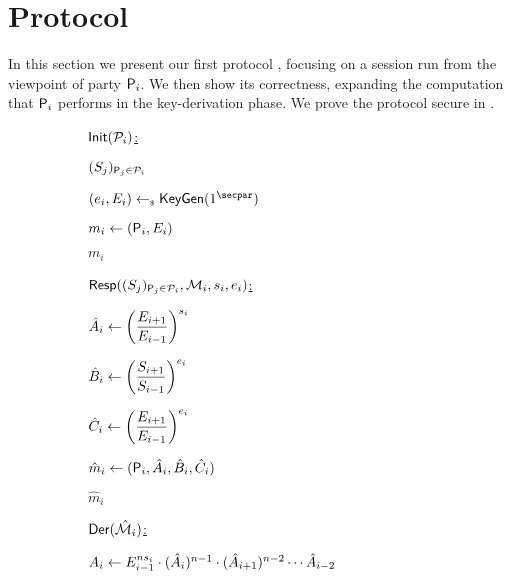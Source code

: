 \section{Protocol}\label{sec:protocol}
In this section we present our first protocol , focusing on a session run from the viewpoint of party $\User[i]$.
We then show its correctness, expanding the computation that $\User[i]$ performs in the key-derivation phase.
We prove the protocol secure  in .

\begin{figure}
	\begin{adjustbox}{varwidth=0.9\textwidth,fbox,center,scale=0.92}
	\begin{subfigure}[t]{.45\linewidth}
		\underline{$\GAKEIni(\PartySet_i)$:}\smallskip
		\begin{nicodemus}[1]
			\item \pcfetch $(S_j)_{\User[j]\in \PartySet_i}$
			\item $(\esk_i,\epk_i) \getsr \KeyGen(1^\secpar)$  
			\item $m_i \gets (\User[i],\epk_i)$
			\item \pcbroadcast $m_i$
		\end{nicodemus}
	\end{subfigure}%
	\begin{subfigure}[t]{.5\linewidth}
		\underline{$\GAKERes((\spk_j)_{\User[j] \in \PartySet_i},\GakeIniMesSet[i],\ssk_i,\esk_i)$:} \smallskip
		\begin{nicodemus}
			\item $\tempsek{i} \gets \left( \dfrac{\epk_{i+1}}{\epk_{i-1}}\right)^{\ssk_i}$ 	
			\item $\tempesk{i} \gets \left( \dfrac{\spk_{i+1}}{\spk_{i-1}}\right)^{\esk_i}$ 	
			\item $\tempeek{i} \gets \left( \dfrac{\epk_{i+1}}{\epk_{i-1}}\right)^{\esk_i}$ 	
			\item $\hat{m}_i \gets (\User[i],\tempsek{i},\tempesk{i},\tempeek{i})$ 
			\item \pcbroadcast $\hat{m}_i$ \\
		\end{nicodemus}
	\end{subfigure}
	\begin{subfigure}{0.7\linewidth}
		\underline{$\GAKEDer(\GakeResMesSet[i])$:} \smallskip
		\begin{nicodemus}
			\item $\groupsek{i} \gets E_{i-1}^{ns_i} \cdot (\tempsek{i})^{n-1} \cdot (\tempsek{i+1})^{n-2} \cdots \tempsek{i-2}$  \\

\end{nicodemus}
\end{subfigure}
\end{adjustbox}
\end{figure}
